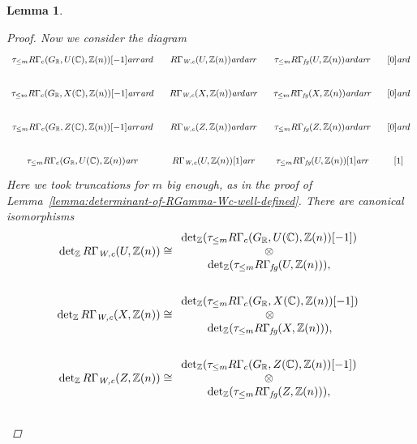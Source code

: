 \documentclass[10pt,a4paper,oneside]{article}
\newcommand{\CC}{\mathbb{C}}
\newcommand{\RR}{\mathbb{R}}
\newcommand{\ZZ}{\mathbb{Z}}
\renewcommand{\det}{\operatorname{det}}
\newcommand{\ar}{\text{\it ar}}
\newcommand{\fg}{\text{\it fg}}
\newcommand{\Wc}{\text{\it W,c}}
\theoremstyle{myplain}
\newtheorem{lemma}[theorem]{Lemma}
\theoremstyle{mydefinition}
\numberwithin{equation}{section}
\begin{document}
\begin{lemma}
\begin{proof}
    Now we consider the diagram
    \[ \begin{tikzcd}[column sep=0.75em,font=\small]
        \tau_{\le m} R\Gamma_c (G_\RR, U (\CC), \ZZ (n))[-1] \ar{r}\ar{d} & R\Gamma_\Wc (U, \ZZ (n))\ar{d}\ar{r} & \tau_{\le m} R\Gamma_\fg (U,\ZZ(n)) \ar{d}\ar{r} & {[0]} \ar{d} \\
        \tau_{\le m} R\Gamma_c (G_\RR, X (\CC), \ZZ (n))[-1] \ar{r}\ar{d} & R\Gamma_\Wc (X, \ZZ (n))\ar{d}\ar{r} & \tau_{\le m} R\Gamma_\fg (X,\ZZ(n)) \ar{d}\ar{r} & {[0]} \ar{d} \\
        \tau_{\le m} R\Gamma_c (G_\RR, Z (\CC), \ZZ (n))[-1] \ar{r}\ar{d} & R\Gamma_\Wc (Z, \ZZ (n))\ar{d}\ar{r} & \tau_{\le m} R\Gamma_\fg (Z,\ZZ(n)) \ar{d}\ar{r} & {[0]} \ar{d} \\
        \tau_{\le m} R\Gamma_c (G_\RR, U (\CC), \ZZ (n)) \ar{r} & R\Gamma_\Wc (U, \ZZ (n)) [1] \ar{r} & \tau_{\le m} R\Gamma_\fg (U,\ZZ(n)) [1] \ar{r} & {[1]}
      \end{tikzcd} \]
    Here we took truncations for $m$ big enough, as in the proof of
    Lemma~\ref{lemma:determinant-of-RGamma-Wc-well-defined}. There are canonical
    isomorphisms
    \begin{align*}
      \notag \det_\ZZ R\Gamma_\Wc (U, \ZZ(n)) & \cong \begin{array}{c} \det_\ZZ (\tau_{\le m} R\Gamma_c (G_\RR, U (\CC), \ZZ (n)) [-1]) \\ \otimes \\ \det_\ZZ (\tau_{\le m} R\Gamma_\fg (U, \ZZ(n))), \end{array} \\
      \\
      \notag \det_\ZZ R\Gamma_\Wc (X, \ZZ(n)) & \cong \begin{array}{c} \det_\ZZ (\tau_{\le m} R\Gamma_c (G_\RR, X (\CC), \ZZ (n)) [-1]) \\ \otimes \\ \det_\ZZ (\tau_{\le m} R\Gamma_\fg (X, \ZZ(n))), \end{array} \\
      \\
      \notag \det_\ZZ R\Gamma_\Wc (Z, \ZZ(n)) & \cong \begin{array}{c} \det_\ZZ (\tau_{\le m} R\Gamma_c (G_\RR, Z (\CC), \ZZ (n)) [-1]) \\ \otimes \\ \det_\ZZ (\tau_{\le m} R\Gamma_\fg (Z, \ZZ(n))), \end{array} \\
      \\

\end{align*}
\end{proof}
\end{lemma}
\end{document}
